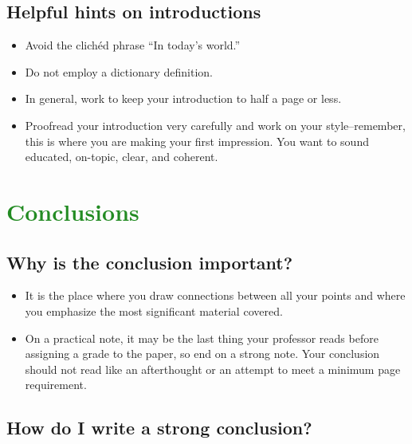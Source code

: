 \documentclass[12pt, hidelinks]{article} %
\begin{document}
 
\subsection{Helpful hints on introductions}

\begin{itemize}
\item Avoid the clich\'ed phrase ``In today's world.''
        	
\item Do not employ a dictionary definition.
       	
\item In general, work to keep your introduction to half a page or less.    	  
 
\item Proofread your introduction very carefully and work on your style--remember, this is where you are making your first impression. You want to sound educated, on-topic, clear, and coherent.
 \end{itemize}



\section{\textcolor{ForestGreen}{Conclusions}}  
\subsection{Why is the conclusion important?}

\begin{itemize}
\item It is the place where you draw connections between all your points and where you emphasize the most significant material covered.
 
\item On a practical note, it may be the last thing your professor reads before assigning a grade to the paper, so end on a strong note. Your conclusion should not read like an afterthought or an attempt to meet a minimum page requirement. 
\end{itemize}

\subsection{How do I write a strong conclusion?}
        	
\end{document}
